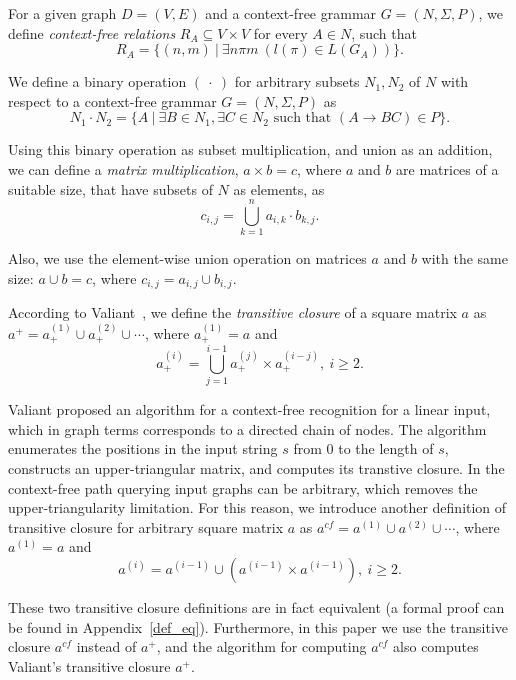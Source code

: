 For a given graph \mbox{$D = (V, E)$} and a context-free grammar $G = (N, \Sigma, P)$, we define \emph{context-free relations} \mbox{$R_A \subseteq V \times V$} for every \mbox{$A \in N$}, such that $$R_A = \{(n,m)~|~\exists n \pi m~(l(\pi) \in L(G_A))\}.$$

We define a binary operation $(~\cdot~)$ for arbitrary subsets \mbox{$N_1, N_2$} of $N$ with respect to a context-free grammar \mbox{$G = (N, \Sigma, P)$} as $$N_1 \cdot N_2 = \{A~|~\exists B \in N_1, \exists C \in N_2 \text{ such that }(A \rightarrow B C) \in P\}.$$

Using this binary operation as subset multiplication, and union as an addition, we can define a \emph{matrix multiplication}, \mbox{$a \times b = c$}, where $a$ and $b$ are matrices of a suitable size, that have subsets of $N$ as elements, as $$c_{i,j} = \bigcup^{n}_{k=1}{a_{i,k} \cdot b_{k,j}}.$$

Also, we use the element-wise union operation on matrices $a$ and $b$ with the same size: \mbox{$a \cup b = c$}, where $c_{i,j} = a_{i,j} \cup b_{i,j}.$

According to Valiant~\cite{valiant}, we define the \emph{transitive closure} of a square matrix $a$ as \mbox{$a^+ = a^{(1)}_+ \cup a^{(2)}_+ \cup \cdots$}, where \mbox{$a^{(1)}_+ = a$} and $$a^{(i)}_+ = \bigcup^{i-1}_{j=1}{a^{(j)}_+ \times a^{(i-j)}_+}, ~i \ge 2.$$

Valiant proposed an algorithm for a context-free recognition for a linear input, which in graph terms corresponds to a directed chain of nodes. The algorithm enumerates the positions in the input string $s$ from 0 to the length of $s$, constructs an upper-triangular matrix, and computes its transtive closure. In the context-free path querying input graphs can be arbitrary, which removes the upper-triangularity  limitation. For this reason, we introduce another definition of transitive closure for arbitrary square matrix $a$ as \mbox{$a^{cf} = a^{(1)} \cup a^{(2)} \cup \cdots$}, where \mbox{$a^{(1)} = a$} and $$a^{(i)} = a^{(i-1)} \cup (a^{(i-1)} \times a^{(i-1)}), ~i \ge 2.$$

These two transitive closure definitions are in fact equivalent (a formal proof can be found in Appendix~\ref{def_eq}). Furthermore, in this paper we use the transitive closure $a^{cf}$ instead of $a^+$, and the algorithm for computing $a^{cf}$ also computes Valiant's transitive closure $a^+$.
